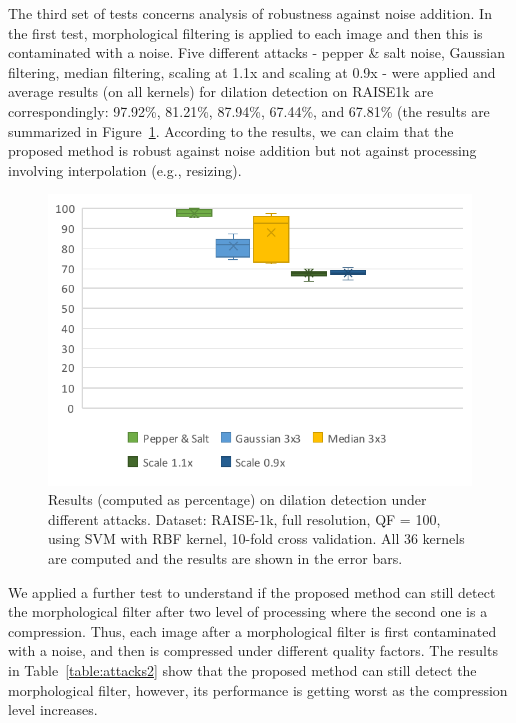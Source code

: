 \documentclass{ieeeaccess}
\begin{document}
The third set of tests concerns analysis of robustness against noise addition. In the first test, morphological filtering is applied to each image and then this is contaminated with a noise. Five different attacks - pepper \& salt noise, Gaussian filtering, median filtering, scaling at 1.1x and scaling at 0.9x - were applied and average results (on all kernels) for dilation detection on RAISE1k are correspondingly: 97.92\%, 81.21\%, 87.94\%, 67.44\%, and 67.81\% (the results are summarized in Figure~\ref{fig:attacks_1}. According to the results, we can claim that the proposed method is robust against noise addition but not against processing involving interpolation (e.g., resizing). 

\begin{figure}[h!]
	\centering
	\includegraphics[width=\linewidth]{attacks_1.pdf}
	\caption{Results (computed as percentage) on dilation detection under different attacks. Dataset: RAISE-1k, full resolution, QF = 100, using SVM with RBF kernel, 10-fold cross validation. All 36 kernels are computed and the results are shown in the error bars.}
	\label{fig:attacks_1}
\end{figure}

We applied a further test to understand if the proposed method can still detect the morphological filter after two level of processing where the second one is a compression. Thus, each image after a morphological filter is first contaminated with a noise, and then is compressed under different quality factors.  The results in Table~\ref{table:attacks2} show that the proposed method can still detect the morphological filter, however, its performance is getting worst as the compression level increases.  
\end{document}
